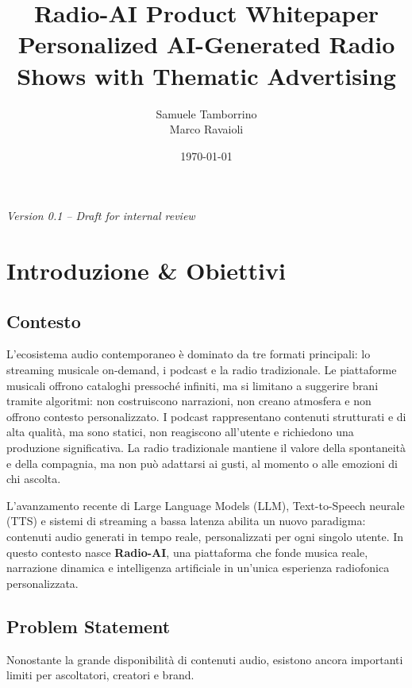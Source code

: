 \documentclass[11pt,a4paper]{article}
\title{\textbf{Radio-AI Product Whitepaper}\\[4pt]
\large Personalized AI-Generated Radio Shows with Thematic Advertising}
\author{%
  Samuele Tamborrino \\
  Marco Ravaioli
}
\date{\today}
\begin{document}
\maketitle
\thispagestyle{empty}
\vfill
\begin{center}
    \textit{Version 0.1 -- Draft for internal review}
\end{center}
\newpage

\tableofcontents
\newpage

\section{Introduzione \& Obiettivi}

\subsection{Contesto}

L’ecosistema audio contemporaneo è dominato da tre formati principali: lo streaming musicale on-demand, i podcast e la radio tradizionale.  
Le piattaforme musicali offrono cataloghi pressoché infiniti, ma si limitano a suggerire brani tramite algoritmi: non costruiscono narrazioni, non creano atmosfera e non offrono contesto personalizzato.  
I podcast rappresentano contenuti strutturati e di alta qualità, ma sono statici, non reagiscono all’utente e richiedono una produzione significativa.  
La radio tradizionale mantiene il valore della spontaneità e della compagnia, ma non può adattarsi ai gusti, al momento o alle emozioni di chi ascolta.

L’avanzamento recente di Large Language Models (LLM), Text-to-Speech neurale (TTS) e sistemi di streaming a bassa latenza abilita un nuovo paradigma: contenuti audio generati in tempo reale, personalizzati per ogni singolo utente.  
In questo contesto nasce \textbf{Radio-AI}, una piattaforma che fonde musica reale, narrazione dinamica e intelligenza artificiale in un’unica esperienza radiofonica personalizzata.

\subsection{Problem Statement}

Nonostante la grande disponibilità di contenuti audio, esistono ancora importanti limiti per ascoltatori, creatori e brand.
\end{document}
